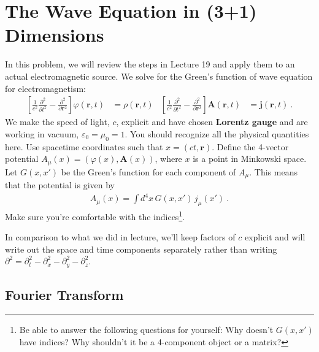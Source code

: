 \documentclass[12pt]{article}
\numberwithin{equation}{section}    %
\renewcommand{\vec}[1]{\mathbf{#1}} %
\begin{document}
\section{The Wave Equation in (3+1) Dimensions}
\label{problem:wave:eq:3d}

In this problem, we will review the steps in Lecture 19 and apply them to an actual electromagnetic source. 
%
We solve for the Green's function of wave equation for electromagnetism: 
\begin{align}
	\left[\frac{1}{c^2}\frac{\partial^2}{\partial t^2} - \frac{\partial^2}{\partial \vec{r}^2}\right] 
	\varphi(\vec{r},t) &= \rho(\vec{r},t)
	&
	\left[\frac{1}{c^2}\frac{\partial^2}{\partial t^2} - \frac{\partial^2}{\partial \vec{r}^2}\right]
	\vec A(\vec{r},t) &= \vec j(\vec{r},t) \ .
	\label{eq:EM:wave}
\end{align}
We make the speed of light, $c$, explicit and have chosen \textbf{Lorentz gauge} and are working in vacuum, $\varepsilon_0 = \mu_0 = 1$. 
%
You should recognize all the physical quantities here. 
% 
Use spacetime coordinates such that $x = (ct,\vec r)$. Define the 4-vector potential $A_\mu(x) = \left(\varphi(x),\vec A(x)\right)$, where $x$ is a point in Minkowski space. Let $G(x,x')$ be the Green's function for each component of $A_\mu$. 
%
This means that the potential is given by
\begin{align}
	A_\mu(x) = \int d^4x \, G(x,x') \, j_\mu(x') \ .
\end{align}
Make sure you're comfortable with the indices\footnote{Be able to answer the following questions for yourself: Why doesn't $G(x,x')$ have indices? Why shouldn't it be a 4-component object or a matrix?}. 

In comparison to what we did in lecture, we'll keep factors of $c$ explicit and will write out the space and time components separately rather than writing $\partial^2 = \partial_t^2 -\partial_x^2 -\partial_y^2 -\partial_z^2$.




\subsection{Fourier Transform}
\end{document}
